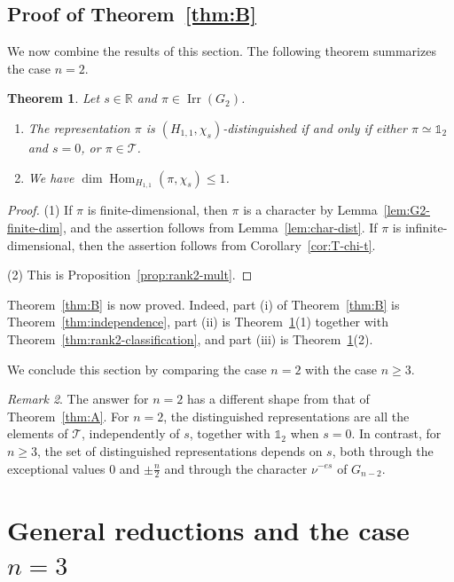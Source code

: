 \documentclass[11pt]{amsart}
\numberwithin{equation}{section}
\theoremstyle{plain}
\newtheorem{theorem}{Theorem}[section]
\theoremstyle{definition}
\theoremstyle{remark}
\newtheorem{remark}[theorem]{Remark}
\newcommand{\R}{\mathbb{R}}
\newcommand{\one}{\mathds{1}}
\newcommand{\T}{\mathcal{T}}
\DeclareMathOperator{\Hom}{Hom}
\DeclareMathOperator{\Irr}{Irr}
\begin{document}
\subsection{Proof of Theorem~\ref{thm:B}}\label{ss:rank2-main}

We now combine the results of this section. The following theorem summarizes the case $n=2$.

\begin{theorem}\label{thm:main-n2}
	Let $s\in\R$ and $\pi\in\Irr(G_2)$.
	\begin{enumerate}
		\item The representation $\pi$ is $(H_{1,1},\chi_s)$-distinguished if and only if either $\pi\simeq\one_2$ and $s=0$, or $\pi\in\T$.
		\item We have $\dim\Hom_{H_{1,1}}(\pi,\chi_s)\le1$.
	\end{enumerate}
\end{theorem}

\begin{proof}
	(1) If $\pi$ is finite-dimensional, then $\pi$ is a character by Lemma~\ref{lem:G2-finite-dim}, and the assertion follows from Lemma~\ref{lem:char-dist}. If $\pi$ is infinite-dimensional, then the assertion follows from Corollary~\ref{cor:T-chi-t}.
	
	(2) This is Proposition~\ref{prop:rank2-mult}.
\end{proof}

Theorem~\ref{thm:B} is now proved. Indeed, part (i) of Theorem~\ref{thm:B} is Theorem~\ref{thm:independence}, part (ii) is Theorem~\ref{thm:main-n2}(1) together with Theorem~\ref{thm:rank2-classification}, and part (iii) is Theorem~\ref{thm:main-n2}(2).

We conclude this section by comparing the case $n=2$ with the case $n\ge3$.

\begin{remark}\label{rem:n2-vs-n3}
	The answer for $n=2$ has a different shape from that of Theorem~\ref{thm:A}. For $n=2$, the distinguished representations are all the elements of $\T$, independently of $s$, together with $\one_2$ when $s=0$. In contrast, for $n\ge3$, the set of distinguished representations depends on $s$, both through the exceptional values $0$ and $\pm\frac n2$ and through the character $\nu^{-es}$ of $G_{n-2}$.
\end{remark}

\section{General reductions and the case \texorpdfstring{$n=3$}{n=3}}\label{sec:n3}
\end{document}
